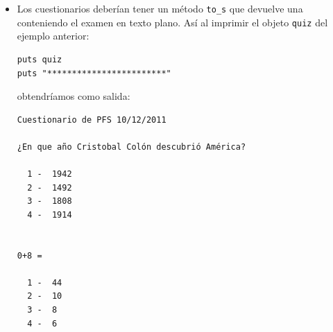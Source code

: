 \begin{itemize}
\item Los cuestionarios deberían tener un método \verb|to_s| que devuelve una \String{}
conteniendo el examen en texto plano.
Así al imprimir el objeto \verb|quiz| del ejemplo anterior:
\begin{verbatim}
puts quiz
puts "************************"
\end{verbatim}
obtendríamos como salida:
\begin{verbatim}
Cuestionario de PFS 10/12/2011

¿En que año Cristobal Colón descubrió América?

  1 -  1942
  2 -  1492
  3 -  1808
  4 -  1914


0+8 = 

  1 -  44
  2 -  10
  3 -  8
  4 -  6



\end{verbatim}
\end{itemize}
